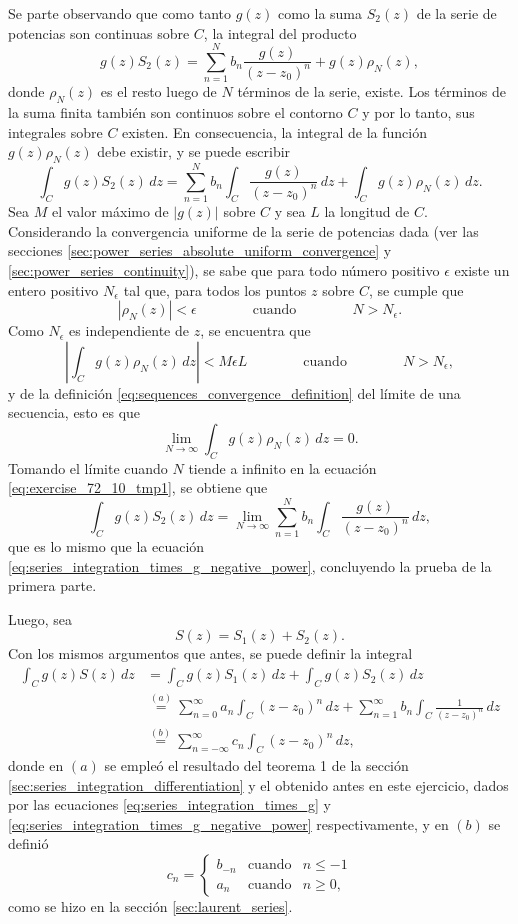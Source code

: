 \documentclass[a4paper]{report}
\begin{document}
Se parte observando que como tanto \(g(z)\) como la suma \(S_2(z)\) de la serie de potencias son continuas sobre \(C\), la integral del producto 
\[
 g(z)S_2(z)=\sum_{n=1}^{N}b_n\frac{g(z)}{(z-z_0)^n}+g(z)\rho_N(z), 
\]
donde \(\rho_N(z)\) es el resto luego de \(N\) términos de la serie, existe. Los términos de la suma finita también son continuos sobre el contorno \(C\) y por lo tanto, sus integrales sobre \(C\) existen. En consecuencia, la integral de la función \(g(z)\rho_N(z)\) debe existir, y se puede escribir
\begin{equation}\label{eq:exercise_72_10_tmp1}
 \int_C g(z)S_2(z)\,dz=\sum_{n=1}^{N}b_n\int_C\frac{g(z)}{(z-z_0)^n}\,dz+\int_Cg(z)\rho_N(z)\,dz. 
\end{equation}
Sea \(M\) el valor máximo de \(|g(z)|\) sobre \(C\) y sea \(L\) la longitud de \(C\). Considerando la convergencia uniforme de la serie de potencias dada (ver las secciones \ref{sec:power_series_absolute_uniform_convergence} y \ref{sec:power_series_continuity}), se sabe que para todo número positivo \(\epsilon\) existe un entero positivo \(N_\epsilon\) tal que, para todos los puntos \(z\) sobre \(C\), se cumple que
\[
 |\rho_N(z)|<\epsilon
 \qquad\qquad\textrm{cuando}\qquad\qquad
 N>N_\epsilon. 
\]
Como \(N_\epsilon\) es independiente de \(z\), se encuentra que 
\[
 \left|\int_C g(z)\rho_N(z)\,dz\right|<M\epsilon L
 \qquad\qquad\textrm{cuando}\qquad\qquad
 N>N_\epsilon, 
\]
y de la definición \ref{eq:sequences_convergence_definition} del límite de una secuencia, esto es que
\[
 \lim_{N\to\infty}\int_C g(z)\rho_N(z)\,dz=0.
\]
Tomando el límite cuando \(N\) tiende a infinito en la ecuación \ref{eq:exercise_72_10_tmp1}, se obtiene que
\[
 \int_C g(z)S_2(z)\,dz=\lim_{N\to\infty}\sum_{n=1}^{N}b_n\int_C\frac{g(z)}{(z-z_0)^n}\,dz,  
\]
que es lo mismo que la ecuación \ref{eq:series_integration_times_g_negative_power}, concluyendo la prueba de la primera parte.

Luego, sea 
\[
 S(z)=S_1(z)+S_2(z).
\]
Con los mismos argumentos que antes, se puede definir la integral
\begin{align*}
 \int_Cg(z)S(z)\,dz&=\int_Cg(z)S_1(z)\,dz+\int_Cg(z)S_2(z)\,dz\\
  &\overset{(a)}{=}\sum_{n=0}^\infty a_n\int_C(z-z_0)^n\,dz+\sum_{n=1}^\infty b_n\int_C\frac{1}{(z-z_0)^n}\,dz\\
  &\overset{(b)}{=}\sum_{n=-\infty}^\infty c_n\int_C(z-z_0)^n\,dz,
\end{align*}
donde en \((a)\) se empleó el resultado del teorema 1 de la sección \ref{sec:series_integration_differentiation} y el obtenido antes en este ejercicio, dados por las ecuaciones \ref{eq:series_integration_times_g} y \ref{eq:series_integration_times_g_negative_power} respectivamente, y en \((b)\) se definió
\[
 c_n=
 \left\{
 \begin{array}{lll}
  b_{-n} &\textrm{cuando} &n\leq-1\\
  a_n &\textrm{cuando}&n\geq0,
 \end{array}
 \right.
\]
como se hizo en la sección \ref{sec:laurent_series}.
\end{document}
